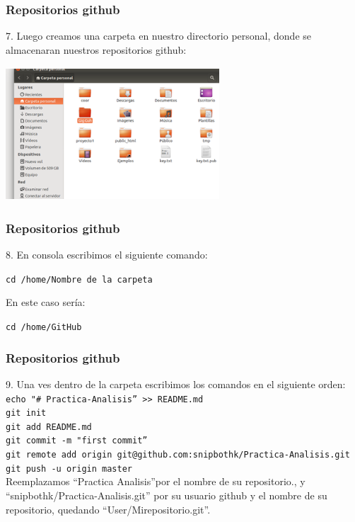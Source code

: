 \documentclass{beamer}
\begin{document}
	\begin{frame}
		\frametitle{Repositorios github}
		{\small 7. Luego creamos una carpeta en nuestro directorio personal, donde se almacenaran nuestros repositorios github:}
		\begin{center}\includegraphics[width=8cm, height=5cm]{8.png}\end{center}
	\end{frame}
	
	\begin{frame}
		\frametitle{Repositorios github}
		{\small 8. En consola escribimos el siguiente comando:}
		\begin{center}
			 {\tt \scriptsize cd /home/Nombre de la carpeta}\\
		\end{center}
		{\small En este caso sería:}
		\begin{center}
			 {\tt \scriptsize cd /home/GitHub}\\
		\end{center}
	\end{frame}
	
	\begin{frame}
		\frametitle{Repositorios github}
		{\small 9. Una ves dentro de la carpeta escribimos los comandos en el siguiente orden:}\\
			 {\tt \scriptsize echo "\# Practica-Analisis” >> README.md}\\
			 {\tt \scriptsize git init}\\
			 {\tt \scriptsize git add README.md}\\
			 {\tt \scriptsize git commit -m "first commit”}\\
			 {\tt \scriptsize git remote add origin git@github.com:snipbothk/Practica-Analisis.git}\\
			 {\tt \scriptsize git push -u origin master}\\
		{\small Reemplazamos “Practica Analisis”por el nombre de su repositorio., y “snipbothk/Practica-Analisis.git” por su usuario github y el nombre de su repositorio, quedando “User/Mirepositorio.git”.}
	\end{frame}
	
\end{document}
